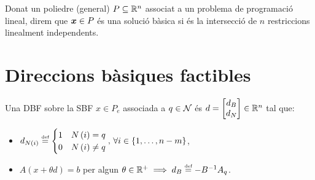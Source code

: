 \begin{defi}
	Donat un poliedre (general) $P\subseteq\mathbb{R}^n$ associat a un problema de programació lineal, direm que $\boldsymbol{x}\in P$ és una solució bàsica si és la intersecció de $n$ restriccions linealment independents.
\end{defi}

\section{Direccions bàsiques factibles}
\begin{defi}
    Una DBF sobre la SBF $x \in P_e$ associada a $q \in \mathcal{N}$ és $d =
    \begin{bmatrix}
        d_B \\
        d_N
    \end{bmatrix}
    \in \mathbb{R}^n$ tal que:
    \begin{itemize}
        \item $d_{N\left(i\right)} \stackrel{\text{\tiny def}}{=}
            \begin{cases}
                1 & N\left(i\right) = q \\
                0 & N\left(i\right) \neq q
            \end{cases}
            ,\, \forall i \in \left\{1, \dots, n-m \right\}$,
        \item $A \left(x + \theta d\right) = b$ per algun $\theta \in \mathbb{R}^+ \implies d_B \stackrel{\text{\tiny def}}{=} -B^{-1} A_q$.
    \end{itemize}
\end{defi}

